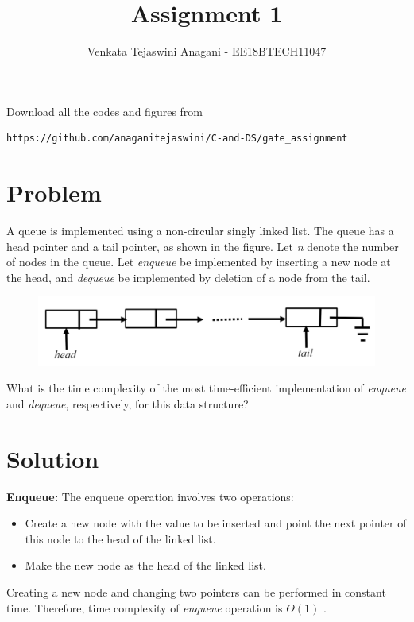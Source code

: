 \documentclass[journal,12pt,twocolumn]{IEEEtran}
\begin{document}
\def\rightbox#1{\makebox[0in][r]{#1}}
\def\centbox#1{\makebox[0in]{#1}}
\def\topbox#1{\raisebox{-\baselineskip}[0in][0in]{#1}}
\def\midbox#1{\raisebox{-0.5\baselineskip}[0in][0in]{#1}}
\vspace{3cm}
\title{Assignment 1}
\author{Venkata Tejaswini Anagani - EE18BTECH11047}
\maketitle
\newpage
\bigskip
\renewcommand{\thefigure}{\theenumi}
\renewcommand{\thetable}{\theenumi}
Download all the codes and figures from
\begin{lstlisting}
https://github.com/anaganitejaswini/C-and-DS/gate_assignment
\end{lstlisting}
\section{Problem}
A queue is implemented using a non-circular singly linked list. The queue has a head pointer and a tail pointer, as shown in the figure. Let \emph{n} denote the number of nodes in the queue. Let \emph{enqueue} be implemented by inserting a new node at the head, and \emph{dequeue} be implemented by deletion of a node from the tail.


\begin{figure}[!bth]
    \centering
    \includegraphics[scale=0.4]{figs/queue.png}
    \caption{}
    \label{fig1}
\end{figure}

What is the time complexity of the most time-efficient implementation of \emph{enqueue} and \emph{dequeue}, respectively, for this data structure?


\section{Solution}
\textbf{Enqueue:} The enqueue operation involves two operations:
\begin{itemize}
    \item Create a new node with the value to be inserted and point the next pointer of this node to the head of the linked list.
    \item Make the new node as the head of the linked list.
\end{itemize}
Creating a new node and changing two pointers can be performed in constant time. Therefore, time complexity of \emph{enqueue} operation is $\Theta (1)$ .
\\
\end{document}

